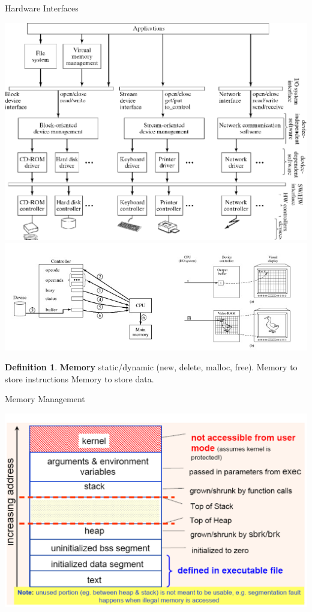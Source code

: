 \documentclass[12pt,a4paper]{article}
\theoremstyle{definition}
\newtheorem{definition}{Definition}[section]
\begin{document}
\begin{tcolorbox}
	\textsf{Hardware Interfaces}
	
	\includegraphics[scale=0.3]{m1/hardwareDevice}
	\centering
	\includegraphics[scale=0.4]{m1/hardwareController}
	\centering
\end{tcolorbox}

\begin{definition}{\textbf{Memory}}
	static/dynamic (\textsf{new, delete, malloc, free}). Memory to store instructions
Memory to store data.
\end{definition}

\begin{tcolorbox}
	\textsf{Memory Management}
	
	\includegraphics[scale=0.3]{m1/memoryManagement}
	\centering
\end{tcolorbox}
\end{document}
